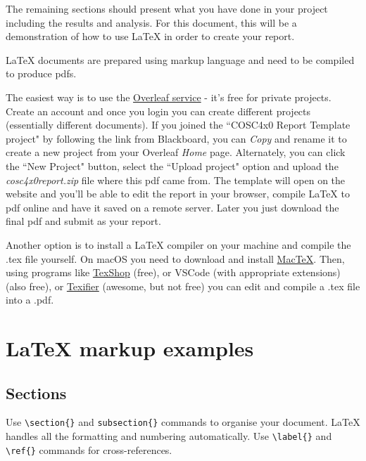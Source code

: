 \documentclass[12pt]{article}
\begin{document}
The remaining sections should present what you have done in your project including the results and analysis. For this document, this will be a demonstration of how to use \LaTeX{} in order to create your report. 

\LaTeX{} documents are prepared using markup language and need to be compiled to produce pdfs. 

The easiest way is to use the \href{https://www.overleaf.com}{Overleaf service} - it's free for private projects. Create an account and once you login you can create different projects (essentially different documents). If you joined the ``COSC4x0 Report Template project" by following the link from Blackboard, you can \textit{Copy} and rename it to create a new project from your Overleaf \textit{Home} page. Alternately, you can click the ``New Project" button, select the ``Upload project" option and upload the \textit{cosc4x0report.zip} file where this pdf came from. The template will open on the website and you'll be able to edit the report in your browser, compile LaTeX to pdf online and have it saved on a remote server. Later you just download the final pdf and submit as your report.   

Another option is to install a LaTeX compiler on your machine and compile the .tex file yourself. On macOS you need to download and install \href{http://www.tug.org/mactex/downloading.html}{MacTeX}. Then, using programs like \href{http://pages.uoregon.edu/koch/texshop/}{TexShop} (free), or VSCode (with appropriate extensions) (also free), or \href{https://www.texifier.com/}{Texifier} (awesome, but not free) you can edit and compile a .tex file into a .pdf.

\section{\LaTeX{} markup examples}
\label{sec:examples}
 
\subsection{Sections}

Use \verb$\section{}$ and \verb$subsection{}$ commands to organise your document. \LaTeX{} handles all the formatting and numbering automatically. Use \verb$\label{}$ and \verb$\ref{}$ commands for cross-references.
\end{document}
